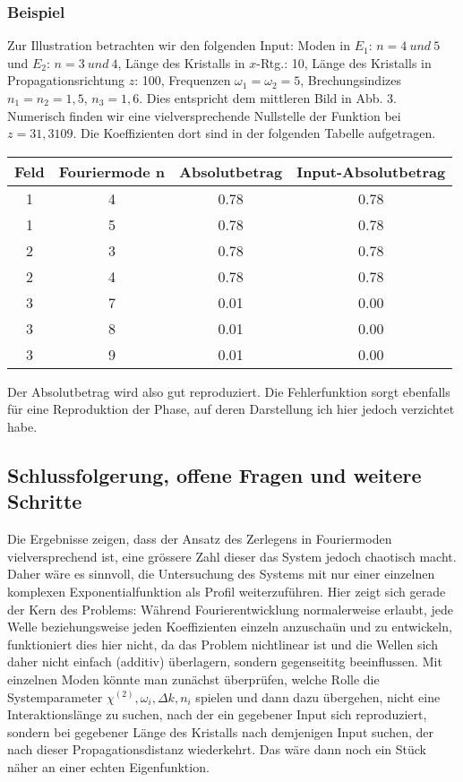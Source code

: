 \documentclass{article}
\begin{document}
\subsubsection{Beispiel}
Zur Illustration betrachten wir den folgenden Input: Moden in $E_1$: $n=4 \ und\ 5$ und $E_2$: $n=3\ und \ 4$, L\"{a}nge des Kristalls in $x$-Rtg.: 10, L\"{a}nge des Kristalls in Propagationsrichtung $z$: 100, Frequenzen $\omega_1=\omega_2=5$, Brechungsindizes $n_1=n_2=1,5$, $n_3=1,6$. Dies entspricht dem mittleren Bild in Abb. 3. Numerisch finden wir eine vielversprechende Nullstelle der Funktion bei $z=31,3109$. Die Koeffizienten dort sind in der folgenden Tabelle aufgetragen.
\begin{center}
 \begin{tabular}{||c c c c||} 
 \hline
Feld & Fouriermode n & Absolutbetrag & Input-Absolutbetrag \\ [0.5ex] 
 \hline\hline
 1 & 4 & 0.78 &  0.78 \\ 
 \hline
 1 & 5 & 0.78 &  0.78 \\
 \hline
 2 & 3 & 0.78 &  0.78 \\
 \hline
 2 & 4 & 0.78 &  0.78 \\
 \hline
 3 & 7 & 0.01 &  0.00 \\
 \hline
 3 & 8 & 0.01 &  0.00 \\
 \hline
 3 & 9 & 0.01 &  0.00 \\ [1ex] 
 \hline
\end{tabular}
\end{center}
Der Absolutbetrag wird also gut reproduziert. Die Fehlerfunktion sorgt ebenfalls f\"{u}r eine Reproduktion der Phase, auf deren Darstellung ich hier jedoch verzichtet habe.
\subsection{Schlussfolgerung, offene Fragen und weitere Schritte}
Die Ergebnisse zeigen, dass der Ansatz des Zerlegens in Fouriermoden vielversprechend ist, eine gr\"{o}ssere Zahl dieser das System jedoch chaotisch macht. Daher w\"{a}re es sinnvoll, die Untersuchung des Systems mit nur einer einzelnen komplexen Exponentialfunktion als Profil weiterzuf\"{u}hren. Hier zeigt sich gerade der Kern des Problems: W\"{a}hrend Fourierentwicklung normalerweise erlaubt, jede Welle beziehungsweise jeden Koeffizienten einzeln anzuscha\"{u}n und zu entwickeln, funktioniert dies hier nicht, da das Problem nichtlinear ist und die Wellen sich daher nicht einfach (additiv) \"{u}berlagern, sondern gegenseititg beeinflussen. Mit einzelnen Moden k\"{o}nnte man zun\"{a}chst \"{u}berpr\"{u}fen, welche Rolle die Systemparameter $\chi^{(2)}, \omega_i, \Delta k, n_i$ spielen und dann dazu \"{u}bergehen, nicht eine Interaktionsl\"{a}nge zu suchen, nach der ein gegebener Input sich reproduziert, sondern bei gegebener L\"{a}nge des Kristalls nach demjenigen Input suchen, der nach dieser Propagationsdistanz wiederkehrt. Das w\"{a}re dann noch ein St\"{u}ck n\"{a}her an einer echten Eigenfunktion.
\end{document}
